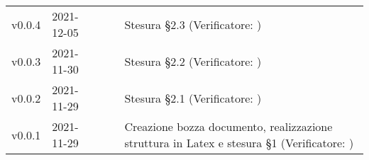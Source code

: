 \begin{longtable}{ m{}<{\centering}  m{}<{\centering}  m{}<{\centering}  m{}<{\centering}  m{}<{\centering} }
	v0.0.4& 2021-12-05 & \LW{} & \AN{} & Stesura §2.3 (Verificatore: \textit{\PV{}})\\

	v0.0.3& 2021-11-30 & \GC & \AN{} & Stesura §2.2 (Verificatore: \textit{\PV{}})\\

	v0.0.2& 2021-11-29 & \FP{} & \AN{} & Stesura §2.1 (Verificatore: \textit{\PV{}})\\

	v0.0.1& 2021-11-29 & \LW{} & \AN{} & Creazione bozza documento, realizzazione struttura in Latex e stesura §1 (Verificatore: \textit{\PV{}})\\

\end{longtable}

\pagebreak